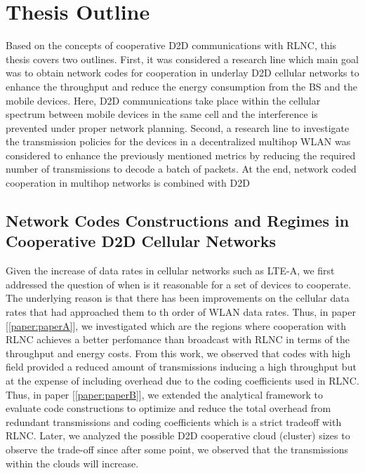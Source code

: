 \section{Thesis Outline}\label{sec:intro_thesis_outline}

Based on the concepts of cooperative \ac{D2D} communications with \ac{RLNC}, this thesis covers two outlines. First, it was considered a research line which main goal was to obtain network codes for cooperation in underlay \ac{D2D} cellular networks to enhance the throughput and reduce the energy consumption from the \ac{BS} and the mobile devices. Here, \ac{D2D} communications take place within the cellular spectrum between mobile devices in the same cell and the interference is prevented under proper network planning. Second, a research line to investigate the transmission policies for the devices in a decentralized multihop \ac{WLAN} was considered to enhance the previously mentioned metrics by reducing the required number of transmissions to decode a batch of packets. At the end, network coded cooperation in multihop networks is combined with \ac{D2D}

\subsection{Network Codes Constructions and Regimes in Cooperative D2D Cellular Networks}

Given the increase of data rates in cellular networks such as \ac{LTE-A}, we first addressed the question of when is it reasonable for a set of devices to cooperate. The underlying reason is that there has been improvements on the cellular data rates that had approached them to th order of \ac{WLAN} data rates. Thus, in paper {[\ref{paper:paperA}]}, we investigated which are the regions where cooperation with \ac{RLNC} achieves a better perfomance than broadcast with \ac{RLNC} in terms of the throughput and energy costs. From this work, we observed that codes with high field provided a reduced amount of transmissions inducing a high throughput but at the expense of including overhead due to the coding coefficients used in \ac{RLNC}. Thus, in paper {[\ref{paper:paperB}]}, we extended the analytical framework to evaluate code constructions to optimize and reduce the total overhead from redundant transmissions and coding coefficients which is a strict tradeoff with \ac{RLNC}. Later, we analyzed the possible \ac{D2D} cooperative cloud (cluster) sizes to observe the trade-off since after some point, we observed that the transmissions within the clouds will increase.

